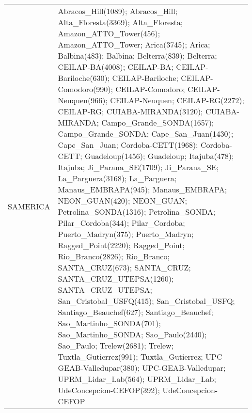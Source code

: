 \documentclass[journal abbreviation, manuscript]{copernicus}
\begin{document}
\begin{table}
\begin{tabularx}{\textwidth}{lX}
  SAMERICA  & Abracos\_Hill(1089); Abracos\_Hill; Alta\_Floresta(3369); Alta\_Floresta; Amazon\_ATTO\_Tower(456); Amazon\_ATTO\_Tower; Arica(3745); Arica; Balbina(483); Balbina; Belterra(839); Belterra; CEILAP-BA(4008); CEILAP-BA; CEILAP-Bariloche(630); CEILAP-Bariloche; CEILAP-Comodoro(990); CEILAP-Comodoro; CEILAP-Neuquen(966); CEILAP-Neuquen; CEILAP-RG(2272); CEILAP-RG; CUIABA-MIRANDA(3120); CUIABA-MIRANDA; Campo\_Grande\_SONDA(1657); Campo\_Grande\_SONDA; Cape\_San\_Juan(1430); Cape\_San\_Juan; Cordoba-CETT(1968); Cordoba-CETT; Guadeloup(1456); Guadeloup; Itajuba(478); Itajuba; Ji\_Parana\_SE(1709); Ji\_Parana\_SE; La\_Parguera(3168); La\_Parguera; Manaus\_EMBRAPA(945); Manaus\_EMBRAPA; NEON\_GUAN(420); NEON\_GUAN; Petrolina\_SONDA(1316); Petrolina\_SONDA; Pilar\_Cordoba(344); Pilar\_Cordoba; Puerto\_Madryn(375); Puerto\_Madryn; Ragged\_Point(2220); Ragged\_Point; Rio\_Branco(2826); Rio\_Branco; SANTA\_CRUZ(673); SANTA\_CRUZ; SANTA\_CRUZ\_UTEPSA(1260); SANTA\_CRUZ\_UTEPSA; San\_Cristobal\_USFQ(415); San\_Cristobal\_USFQ; Santiago\_Beauchef(627); Santiago\_Beauchef; Sao\_Martinho\_SONDA(701); Sao\_Martinho\_SONDA; Sao\_Paulo(2440); Sao\_Paulo; Trelew(2681); Trelew; Tuxtla\_Gutierrez(991); Tuxtla\_Gutierrez; UPC-GEAB-Valledupar(380); UPC-GEAB-Valledupar; UPRM\_Lidar\_Lab(564); UPRM\_Lidar\_Lab; UdeConcepcion-CEFOP(392); UdeConcepcion-CEFOP                                                                                                                                                                                                                                                                                                                                                                                                                                                                                                                                                                                                                                                                                                                                                                                                                                                                                                                                                                                                                                                                                                                                                                                                                                                                                                                                                                                                                                                                                                                                                                                                                                                                                                                                                                                                                                                                                                                                                                                                      
\end{tabularx}
\end{table}
\end{document}
